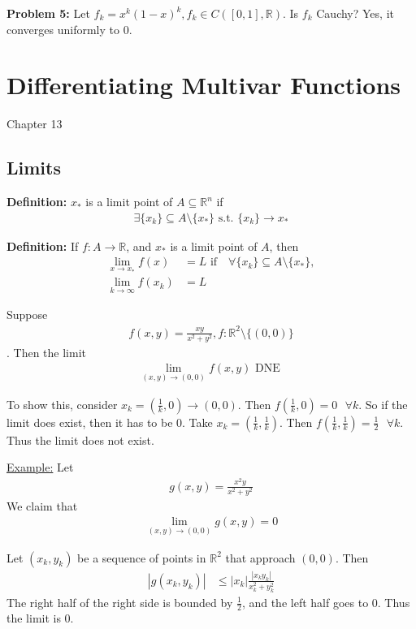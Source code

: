 \documentclass{article}
\newcommand*{\txt}[1]{\text{ #1 }}%
\newcommand*{\fora}{\txt{}\forall}%
\newcommand*{\rr}{\mathbb{R}}%
\begin{document}
\textbf{Problem 5:} Let $f_k=x^k(1-x)^k, f_k\in C([0,1],\rr)$. Is $f_k$ Cauchy? Yes, it converges uniformly to 0.

\section{Differentiating Multivar Functions}

Chapter 13
\subsection{Limits}
\textbf{Definition:} $x_{*}$ is a limit point of $A\subseteq\rr^n$ if \begin{align*}
    \exists \{x_k\}\subseteq A\setminus \{x_{*}\}\txt{s.t.}\{x_k\}\to x_{*}
\end{align*}

\textbf{Definition:} If $f:A\to\rr$, and $x_{*}$ is a limit point of $A$, then \begin{align*}
    \lim_{x\to x_{*}}f(x)&=L\txt{if} \fora\{x_k\}\subseteq A\setminus\{x_{*}\},\\
    \lim_{k\to \infty}f(x_k)&=L
\end{align*}

Suppose \begin{align*}
    f(x,y)=\frac{xy}{x^2+y^2},f:\rr^2\setminus\{(0,0)\}
\end{align*}. Then the limit \begin{align*}
    \lim_{(x,y)\to (0,0)}f(x,y)\txt{DNE}
\end{align*}

To show this, consider $x_k=(\frac{1}{k},0)\to (0,0)$. Then $f(\frac{1}{k},0)=0\fora k$. So if the limit does exist, then it has to be 0. Take $x_k=(\frac{1}{k},\frac{1}{k})$. Then $f(\frac{1}{k},\frac{1}{k})=\frac{1}{2}\fora k$. Thus the limit does not exist.

\underline{Example:} Let \begin{align*}
    g(x,y)=\frac{x^2y}{x^2+y^2}
\end{align*} We claim that \begin{align*}
    \lim_{(x,y)\to (0,0)}g(x,y)=0
\end{align*}

Let $(x_k,y_k)$ be a sequence of points in $\rr^2$ that approach $(0,0)$. Then \begin{align*}
    |g(x_k,y_k)|&\leq |x_k|\frac{|x_ky_k|}{x_k^2+y_k^2}
\end{align*} The right half of the right side is bounded by $\frac{1}{2}$, and the left half goes to 0. Thus the limit is 0.
\end{document}
